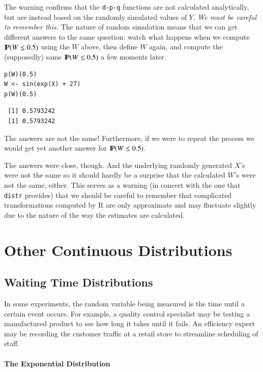 \documentclass[captions=tableheading]{scrbook}
\begin{document}
The warning confirms that the \texttt{d-p-q} functions are not calculated analytically, but are instead based on the randomly simulated values of \(Y\). \emph{We must be careful to remember this.} The nature of random simulation means that we can get different answers to the same question: watch what happens when we compute \(\P(W\leq0.5)\) using the \(W\) above, then define \(W\) again, and compute the (supposedly) same \(\P(W\leq0.5)\) a few moments later.


\begin{verbatim}
p(W)(0.5)
W <- sin(exp(X) + 27)
p(W)(0.5)
\end{verbatim}

\begin{verbatim}
 [1] 0.5793242
 [1] 0.5793242
\end{verbatim}

The answers are not the same! Furthermore, if we were to repeat the process we would get yet another answer for \(\P(W\leq0.5)\).  

The answers were close, though. And the underlying randomly generated \(X\)'s were not the same so it should hardly be a surprise that the calculated \(W\)'s were not the same, either. This serves as a warning (in concert with the one that \texttt{distr} provides) that we should be careful to remember that complicated transformations computed by \textsf{R} are only approximate and may fluctuate slightly due to the nature of the way the estimates are calculated.
\section{Other Continuous Distributions}
\label{sec-6-5}

\label{sec:Other-Continuous-Distributions}
\subsection{Waiting Time Distributions}
\label{sec-6-5-1}

\label{sub:Waiting-Time-Distributions}

In some experiments, the random variable being measured is the time until a certain event occurs. For example, a quality control specialist may be testing a manufactured product to see how long it takes until it fails. An efficiency expert may be recording the customer traffic at a retail store to streamline scheduling of staff. 

\paragraph*{The Exponential Distribution}
\label{sub:The-Exponential-Distribution}
\end{document}
